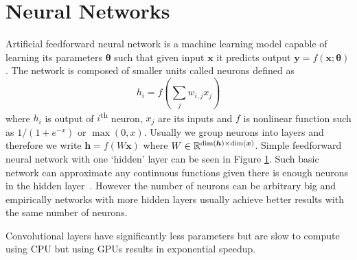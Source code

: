 \section{Neural Networks}
Artificial feedforward neural network is a machine learning model capable of learning its parameters $\bm{\theta}$ such that given input $\bm{x}$ it predicts output $\bm{y}=f(\bm{x};\bm{\theta})$. The network is composed of smaller units called neurons defined as
\begin{equation*}
h_i=f\left(\sum_{j}w_{i,j}x_j\right)
\end{equation*}
where $h_i$ is output of $i$\textsuperscript{th} neuron, $x_j$ are its inputs and $f$ is nonlinear function such as $1/(1+e^{-x})$ or $\max(0, x)$. Usually we group neurons into layers and therefore we write $\bm{h}=f(W\bm{x})$ where $W\in\mathbb{R}^{\dim(\bm{h})\times\dim(\bm{x})}$. Simple feedforward neural network with one `hidden' layer can be seen in Figure \ref{}. Such basic network can approximate any continuous functions given there is enough neurons in the hidden layer~\cite{HORNIK}. However the number of neurons can be arbitrary big and empirically networks with more hidden layers usually achieve better results with the same number of neurons.

Convolutional layers have significantly less parameters but are slow to compute using CPU but using GPUs results in exponential speedup.





